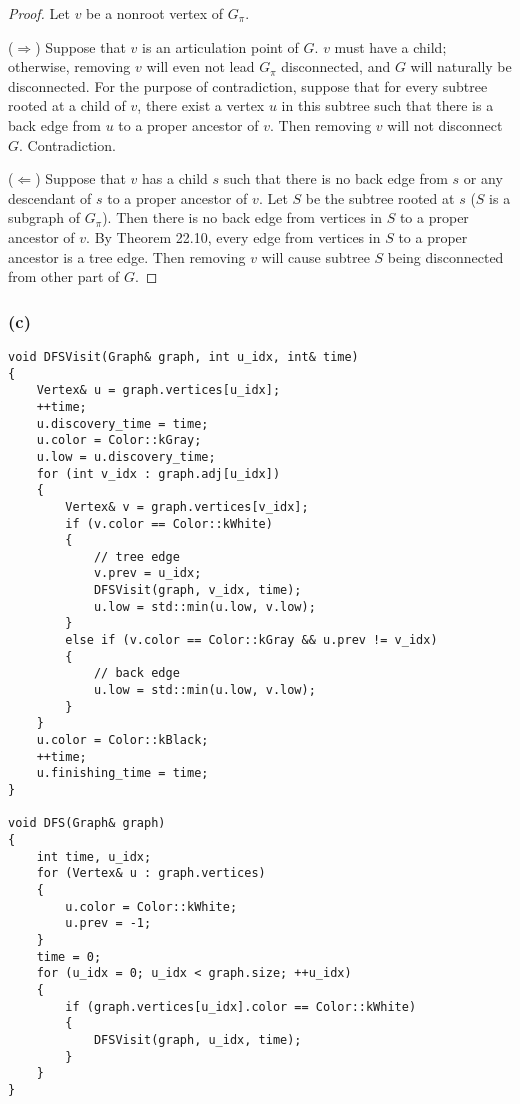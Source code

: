 \begin{proof}
    Let $v$ be a nonroot vertex of $G_\pi$.
    
    ($\Longrightarrow$)
    Suppose that $v$ is an articulation point of $G$.
    $v$ must have a child; 
    otherwise, removing $v$ will even not lead $G_\pi$ disconnected,
    and $G$ will naturally be disconnected.
    For the purpose of contradiction,
    suppose that for every subtree rooted at a child of $v$,
    there exist a vertex $u$ in this subtree such that 
    there is a back edge from $u$ to a proper ancestor of $v$.
    Then removing $v$ will not disconnect $G$.
    Contradiction.

    ($\Longleftarrow$)
    Suppose that $v$ has a child $s$ such that
    there is no back edge from $s$ or any descendant of $s$
    to a proper ancestor of $v$.
    Let $S$ be the subtree rooted at $s$ 
    ($S$ is a subgraph of $G_\pi$).
    Then there is no back edge from vertices in $S$ 
    to a proper ancestor of $v$.
    By Theorem 22.10,
    every edge from vertices in $S$ to a proper ancestor is a tree edge.
    Then removing $v$ will cause subtree $S$ being disconnected
    from other part of $G$.
\end{proof}

\subsubsection*{(c)}

\begin{verbatim}
void DFSVisit(Graph& graph, int u_idx, int& time)
{
    Vertex& u = graph.vertices[u_idx];
    ++time;
    u.discovery_time = time;
    u.color = Color::kGray;
    u.low = u.discovery_time;
    for (int v_idx : graph.adj[u_idx])
    {
        Vertex& v = graph.vertices[v_idx];
        if (v.color == Color::kWhite)
        {
            // tree edge
            v.prev = u_idx;
            DFSVisit(graph, v_idx, time);
            u.low = std::min(u.low, v.low);
        }
        else if (v.color == Color::kGray && u.prev != v_idx)
        {
            // back edge
            u.low = std::min(u.low, v.low);
        }
    }
    u.color = Color::kBlack;
    ++time;
    u.finishing_time = time;
}

void DFS(Graph& graph)
{
    int time, u_idx;
    for (Vertex& u : graph.vertices)
    {
        u.color = Color::kWhite;
        u.prev = -1;
    }
    time = 0;
    for (u_idx = 0; u_idx < graph.size; ++u_idx)
    {
        if (graph.vertices[u_idx].color == Color::kWhite)
        {
            DFSVisit(graph, u_idx, time);
        }
    }
}
\end{verbatim}

